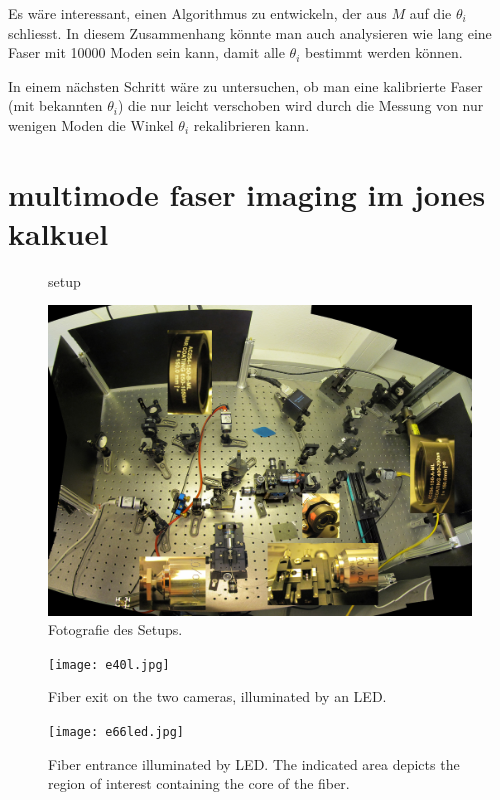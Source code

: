 \documentclass{article}
\begin{document}
Es w\"are interessant, einen Algorithmus zu entwickeln, der aus $M$
auf die $\theta_i$ schliesst. In diesem Zusammenhang k\"onnte man auch
analysieren wie lang eine Faser mit 10000 Moden sein kann, damit alle
$\theta_i$ bestimmt werden k\"onnen.

In einem n\"achsten Schritt w\"are zu untersuchen, ob man eine
kalibrierte Faser (mit bekannten $\theta_i$) die nur leicht verschoben
wird durch die Messung von nur wenigen Moden die Winkel $\theta_i$
rekalibrieren kann.

\section{multimode faser imaging im jones kalkuel}

\begin{figure}[htbp]
  \centering
  
  \caption{setup}
  \label{fig:setup}
\end{figure}



\begin{figure}[htbp]
  \centering
  \includegraphics[width=12cm]{../multi-mode-imaging.jpg}
  \caption{Fotografie des Setups. }
  \label{fig:e40}
\end{figure}


\begin{figure}[htbp]
  \centering
  \texttt{[image: e40l.jpg]}
  \caption{Fiber exit on the two cameras, illuminated by an LED.}
  \label{fig:e40}
\end{figure}

\begin{figure}[htbp]
  \centering
  \texttt{[image: e66led.jpg]}
  \caption{Fiber entrance illuminated by LED. The indicated area
    depicts the region of interest containing the core of the fiber.}
  \label{fig:e66}
\end{figure}
\end{document}
